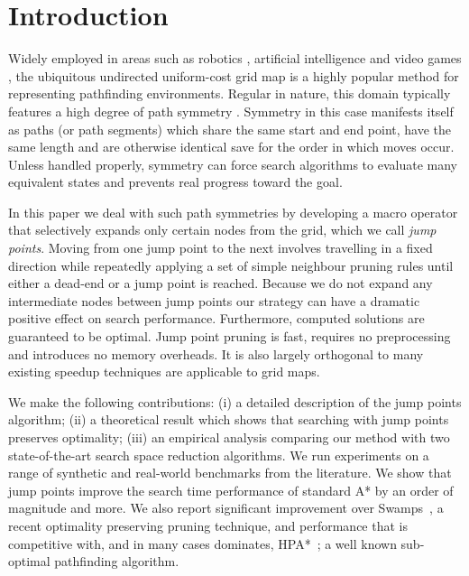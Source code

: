 \section{Introduction}

Widely employed in areas such as robotics \cite{lee09}, artificial intelligence
\cite{wang09} and video games \cite{davis00,sturtevant07}, the ubiquitous
undirected uniform-cost grid map is a highly popular method for representing
pathfinding environments.  Regular in nature, this domain typically features a
high degree of path symmetry \cite{harabor10,pochter10}.  Symmetry in this case
manifests itself as paths (or path segments) which share the same start and end
point, have the same length and are otherwise identical save for the order in
which moves occur.  Unless handled properly, symmetry can force search
algorithms to evaluate many equivalent states and prevents real progress toward
the goal.

In this paper we deal with such path symmetries by developing a macro operator
that selectively expands only certain nodes from the grid, which we call
\emph{jump points}. Moving from one jump point to the next involves travelling
in a fixed direction while repeatedly applying a set of simple neighbour pruning
rules until either a dead-end or a jump point is reached.  Because we do not
expand any intermediate nodes between jump points our strategy can have a
dramatic positive effect on search performance.  Furthermore, computed solutions
are guaranteed to be optimal.  Jump point pruning is fast, requires no
preprocessing and introduces no memory overheads. It is also largely orthogonal to many
existing speedup techniques are applicable to grid maps.

We make the following contributions: (i) a detailed description of the jump
points algorithm; (ii) a theoretical result which shows that searching with jump
points preserves optimality;  (iii) an empirical analysis comparing our method
with two state-of-the-art search space reduction algorithms.  We run experiments
on a range of synthetic and real-world benchmarks from the literature.
We show that jump points improve the search time performance of standard A* by
an order of magnitude and more.  We also report significant improvement over
Swamps~\cite{pochter10}, a recent optimality preserving pruning technique, and
performance that is competitive with, and in many cases dominates,
HPA*~\cite{botea04}; a well known sub-optimal pathfinding algorithm.
